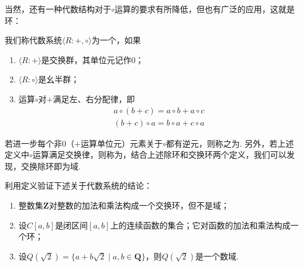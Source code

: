 当然，还有一种代数结构对于$\circ$运算的要求有所降低，但也有广泛的应用，这就是环：
\begin{definition}[环] 
    我们称代数系统$\langle R:+,\circ\rangle$为一个，如果
    \begin{enumerate}
        \item $\langle R:+\rangle$是交换群，其单位元记作0；

        \item $\langle R:\circ\rangle$是幺半群；

        \item 运算$\circ$对$+$满足左、右分配律，即
              \begin{gather*}
                  a\circ(b+c)=a\circ b+a\circ c \\
                  (b+c)\circ a=b\circ a+c\circ a
              \end{gather*}
    \end{enumerate}

    若进一步每个非$0$（$+$运算单位元）元素关于$\circ$都有逆元，则称之为. 另外，若上述定义中$\circ$运算满足交换律，则称为，结合上述除环和交换环两个定义，我们可以发现，交换除环即为域.
\end{definition}

\begin{example}
    利用定义验证下述关于代数系统的结论：
    \begin{enumerate}
        \item 整数集$\mathbf{Z}$对整数的加法和乘法构成一个交换环，但不是域；

        \item 设$C[a,b]$是闭区间$[a,b]$上的连续函数的集合；它对函数的加法和乘法构成一个环；

        \item 设$Q(\sqrt{2})=\{a+b\sqrt{2} \mid a,b\in\mathbf{Q}\}$，则$Q(\sqrt{2})$是一个数域.
    \end{enumerate}
\end{example}

